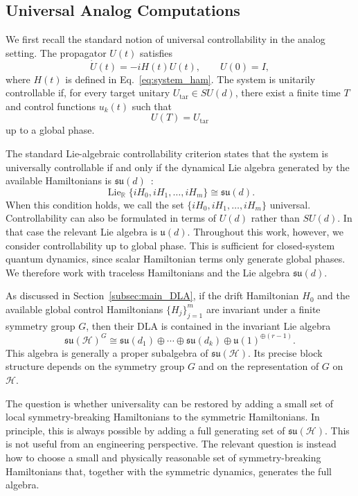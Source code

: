 \documentclass[10pt,twocolumn,superscriptaddress,aps,amsmath,amssymb,citeautoscript,floatfix,prx,longbibliography]{revtex4-2}
\newcounter{alg}
\theoremstyle{plain}
\theoremstyle{plain}
\theoremstyle{plain}
\theoremstyle{plain}
\theoremstyle{plain}
\theoremstyle{plain}
\begin{document}
\subsection{Universal Analog Computations}\label{subsec:main_univ_analog}

We first recall the standard notion of universal controllability in the analog setting. The propagator $U(t)$ satisfies
$$
    \dot U(t)
    =
    -iH(t)U(t),
    \qquad
    U(0)=I,
$$
where $H(t)$ is defined in Eq.~\eqref{eq:system_ham}. The system is unitarily controllable if, for every target unitary $U_{\mathrm{tar}}\in SU(d)$, there exist a finite time $T$ and control functions $u_k(t)$ such that
$$
    U(T)=U_{\mathrm{tar}}
$$
up to a global phase.

The standard Lie-algebraic controllability criterion states that the system is universally controllable if and only if the dynamical Lie algebra generated by the available Hamiltonians is $\mathfrak{su}(d)$~\cite{Albertini2003}:
$$
    \operatorname{Lie}_{\mathbb R}
    \{iH_0,iH_1,\ldots,iH_m\}
    \cong
    \mathfrak{su}(d).
$$
When this condition holds, we call the set $\{iH_0,iH_1,\ldots,iH_m\}$ universal. Controllability can also be formulated in terms of $U(d)$ rather than $SU(d)$. In that case the relevant Lie algebra is $\mathfrak{u}(d)$. Throughout this work, however, we consider controllability up to global phase. This is sufficient for closed-system quantum dynamics, since scalar Hamiltonian terms only generate global phases. We therefore work with traceless Hamiltonians and the Lie algebra $\mathfrak{su}(d)$.

As discussed in Section~\ref{subsec:main_DLA}, if the drift Hamiltonian $H_0$ and the available global control Hamiltonians $\{H_j\}_{j=1}^m$ are invariant under a finite symmetry group $G$, then their DLA is contained in the invariant Lie algebra
$$
    \mathfrak{su}(\mathcal H)^G
    \cong
    \mathfrak{su}(d_1)
    \oplus
    \cdots
    \oplus
    \mathfrak{su}(d_k)
    \oplus
    \mathfrak{u}(1)^{\oplus(r-1)}.
$$
This algebra is generally a proper subalgebra of $\mathfrak{su}(\mathcal H)$. Its precise block structure depends on the symmetry group $G$ and on the representation of $G$ on $\mathcal H$.

The question is whether universality can be restored by adding a small set of local symmetry-breaking Hamiltonians to the symmetric Hamiltonians. In principle, this is always possible by adding a full generating set of $\mathfrak{su}(\mathcal H)$. This is not useful from an engineering perspective. The relevant question is instead how to choose a small and physically reasonable set of symmetry-breaking Hamiltonians that, together with the symmetric dynamics, generates the full algebra.
\end{document}

